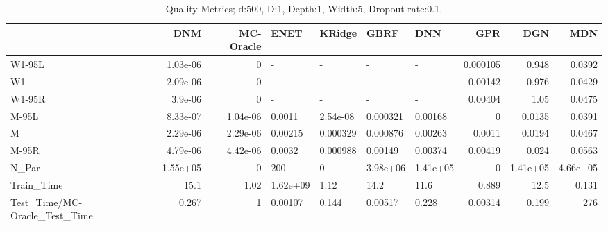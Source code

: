 \begin{table}
\centering
\caption{Quality Metrics; d:500, D:1, Depth:1, Width:5, Dropout rate:0.1.}
\begin{tabular}{lrrllllrrr}
\toprule
{} &      DNM &  MC-Oracle &     ENET &   KRidge &     GBRF &      DNN &      GPR &      DGN &      MDN \\
\midrule
W1-95L                        & 1.03e-06 &          0 &        - &        - &        - &        - & 0.000105 &    0.948 &   0.0392 \\
W1                            & 2.09e-06 &          0 &        - &        - &        - &        - &  0.00142 &    0.976 &   0.0429 \\
W1-95R                        &  3.9e-06 &          0 &        - &        - &        - &        - &  0.00404 &     1.05 &   0.0475 \\
M-95L                         & 8.33e-07 &   1.04e-06 &   0.0011 & 2.54e-08 & 0.000321 &  0.00168 &        0 &   0.0135 &   0.0391 \\
M                             & 2.29e-06 &   2.29e-06 &  0.00215 & 0.000329 & 0.000876 &  0.00263 &   0.0011 &   0.0194 &   0.0467 \\
M-95R                         & 4.79e-06 &   4.42e-06 &   0.0032 & 0.000988 &  0.00149 &  0.00374 &  0.00419 &    0.024 &   0.0563 \\
N\_Par                         & 1.55e+05 &          0 &      200 &        0 & 3.98e+06 & 1.41e+05 &        0 & 1.41e+05 & 4.66e+05 \\
Train\_Time                    &     15.1 &       1.02 & 1.62e+09 &     1.12 &     14.2 &     11.6 &    0.889 &     12.5 &    0.131 \\
Test\_Time/MC-Oracle\_Test\_Time &    0.267 &          1 &  0.00107 &    0.144 &  0.00517 &    0.228 &  0.00314 &    0.199 &      276 \\
\bottomrule
\end{tabular}
\end{table}
